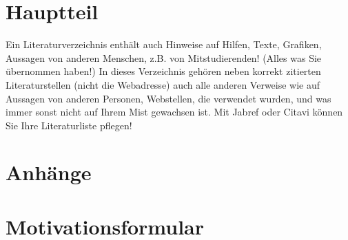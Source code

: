 \documentclass[pdftex,12pt,twoside,footsepline,headsepline,a4paper,final]{scrreprt}
\begin{document}

\tableofcontents
\kontrollseite   %



\chapter{Hauptteil}








%



\printbibliography[heading=bibintoc,title={Referenzen und Literaturverzeichnis}]
\begin{hinweise}
Ein Literaturverzeichnis enthält auch Hinweise auf Hilfen, Texte, Grafiken, Aussagen von anderen Menschen,
z.B. von Mitstudierenden! (Alles was Sie übernommen haben!) In dieses Verzeichnis gehören neben korrekt
zitierten Literaturstellen (nicht die Webadresse) auch alle anderen Verweise wie auf Aussagen von anderen
Personen, Webstellen, die verwendet wurden, und was immer sonst nicht auf Ihrem Mist gewachsen ist.
Mit Jabref oder Citavi können Sie Ihre Literaturliste pflegen!
\end{hinweise}

\appendix
\chapter*{Anh\"{a}nge}

\chapter{Motivationsformular}
\label{anh:motivationsformular}








\end{document}
